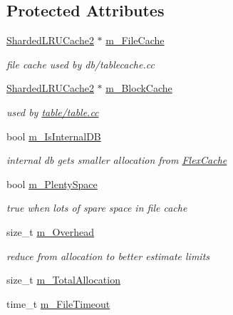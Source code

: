 \subsection*{Protected Attributes}
\begin{DoxyCompactItemize}
\item 
\hyperlink{classleveldb_1_1_sharded_l_r_u_cache2}{Sharded\+L\+R\+U\+Cache2} $\ast$ \hyperlink{classleveldb_1_1_double_cache_aae6771693bdd6eef7171b146af5744ff}{m\+\_\+\+File\+Cache}
\begin{DoxyCompactList}\small\item\em file cache used by db/tablecache.\+cc \end{DoxyCompactList}\item 
\hyperlink{classleveldb_1_1_sharded_l_r_u_cache2}{Sharded\+L\+R\+U\+Cache2} $\ast$ \hyperlink{classleveldb_1_1_double_cache_a67c996a093cd657bc69d4d08a95c984e}{m\+\_\+\+Block\+Cache}
\begin{DoxyCompactList}\small\item\em used by \hyperlink{table_8cc}{table/table.\+cc} \end{DoxyCompactList}\item 
bool \hyperlink{classleveldb_1_1_double_cache_aead367778b68bc2b42d00d20e5739944}{m\+\_\+\+Is\+Internal\+D\+B}
\begin{DoxyCompactList}\small\item\em internal db gets smaller allocation from \hyperlink{classleveldb_1_1_flex_cache}{Flex\+Cache} \end{DoxyCompactList}\item 
bool \hyperlink{classleveldb_1_1_double_cache_a560a908cafaf2dffae1d375c28ad719e}{m\+\_\+\+Plenty\+Space}
\begin{DoxyCompactList}\small\item\em true when lots of spare space in file cache \end{DoxyCompactList}\item 
size\+\_\+t \hyperlink{classleveldb_1_1_double_cache_a76eda02c403cf6bc7f225f612ce098ff}{m\+\_\+\+Overhead}
\begin{DoxyCompactList}\small\item\em reduce from allocation to better estimate limits \end{DoxyCompactList}\item 
size\+\_\+t \hyperlink{classleveldb_1_1_double_cache_a1e37f45144f9a47321def85cd7ceca0b}{m\+\_\+\+Total\+Allocation}
\item 
time\+\_\+t \hyperlink{classleveldb_1_1_double_cache_a1eb779a94cdb5df86333377f365df2b2}{m\+\_\+\+File\+Timeout}

\end{DoxyCompactItemize}
